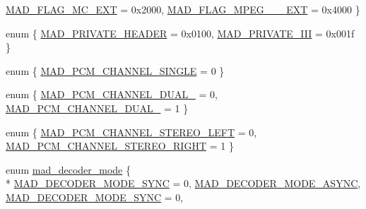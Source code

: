 \begin{DoxyCompactItemize}
\hyperlink{lib-src_2libmad_2msvc_09_09_2mad_8h_a5a77d65f4abba81d4456fa6ba8136e24a528d9a4b7522161be3007f1f75db51b0}{M\+A\+D\+\_\+\+F\+L\+A\+G\+\_\+\+M\+C\+\_\+\+E\+XT} = 0x2000, 
\hyperlink{lib-src_2libmad_2msvc_09_09_2mad_8h_a5a77d65f4abba81d4456fa6ba8136e24aa3a9b72a0bc8246559527bdd3e368caa}{M\+A\+D\+\_\+\+F\+L\+A\+G\+\_\+\+M\+P\+E\+G\+\_\+\_\+\_\+\+E\+XT} = 0x4000
 \}
\item 
enum \{ \hyperlink{lib-src_2libmad_2msvc_09_09_2mad_8h_aad393aa3e173d7f081ab4bbc6ba5027da0ff8b422c34ae6b5e18445b9a6d29cca}{M\+A\+D\+\_\+\+P\+R\+I\+V\+A\+T\+E\+\_\+\+H\+E\+A\+D\+ER} = 0x0100, 
\hyperlink{lib-src_2libmad_2msvc_09_09_2mad_8h_aad393aa3e173d7f081ab4bbc6ba5027daf758cc40b67b8026a690539980997422}{M\+A\+D\+\_\+\+P\+R\+I\+V\+A\+T\+E\+\_\+\+I\+II} = 0x001f
 \}
\item 
enum \{ \hyperlink{lib-src_2libmad_2msvc_09_09_2mad_8h_a4f126a0a9b1d8c6a8f46a051ef8830bbafae14beabc5daac23b169a27d1592161}{M\+A\+D\+\_\+\+P\+C\+M\+\_\+\+C\+H\+A\+N\+N\+E\+L\+\_\+\+S\+I\+N\+G\+LE} = 0
 \}
\item 
enum \{ \hyperlink{lib-src_2libmad_2msvc_09_09_2mad_8h_adbaf9202177df73e6880eab6e6aab329a96d03096fe786ca4ebd1c56783e215de}{M\+A\+D\+\_\+\+P\+C\+M\+\_\+\+C\+H\+A\+N\+N\+E\+L\+\_\+\+D\+U\+A\+L\+\_} = 0, 
\hyperlink{lib-src_2libmad_2msvc_09_09_2mad_8h_adbaf9202177df73e6880eab6e6aab329a0cb36fd87e1f82802bf7c770b5ed35f5}{M\+A\+D\+\_\+\+P\+C\+M\+\_\+\+C\+H\+A\+N\+N\+E\+L\+\_\+\+D\+U\+A\+L\+\_} = 1
 \}
\item 
enum \{ \hyperlink{lib-src_2libmad_2msvc_09_09_2mad_8h_a7495a48740c9d555f7fbcb48246dbd93a4eabf052fa0b2552b633c9a0cbed144b}{M\+A\+D\+\_\+\+P\+C\+M\+\_\+\+C\+H\+A\+N\+N\+E\+L\+\_\+\+S\+T\+E\+R\+E\+O\+\_\+\+L\+E\+FT} = 0, 
\hyperlink{lib-src_2libmad_2msvc_09_09_2mad_8h_a7495a48740c9d555f7fbcb48246dbd93a3947dd79b19e175a319de176c7c35f14}{M\+A\+D\+\_\+\+P\+C\+M\+\_\+\+C\+H\+A\+N\+N\+E\+L\+\_\+\+S\+T\+E\+R\+E\+O\+\_\+\+R\+I\+G\+HT} = 1
 \}
\item 
enum \hyperlink{lib-src_2libmad_2msvc_09_09_2mad_8h_a0d55d67e9f9acf69f677f86053e88b6a}{mad\+\_\+decoder\+\_\+mode} \{ \\*
\hyperlink{libmad_2decoder_8h_a0d55d67e9f9acf69f677f86053e88b6aa4670478d6f7c6dd89f794e9a87091ac2}{M\+A\+D\+\_\+\+D\+E\+C\+O\+D\+E\+R\+\_\+\+M\+O\+D\+E\+\_\+\+S\+Y\+NC} = 0, 
\hyperlink{libmad_2decoder_8h_a0d55d67e9f9acf69f677f86053e88b6aa0d44eb0cd37486eb0c2a67342423c8ca}{M\+A\+D\+\_\+\+D\+E\+C\+O\+D\+E\+R\+\_\+\+M\+O\+D\+E\+\_\+\+A\+S\+Y\+NC}, 
\hyperlink{lib-src_2libmad_2msvc_09_09_2mad_8h_a0d55d67e9f9acf69f677f86053e88b6aa4670478d6f7c6dd89f794e9a87091ac2}{M\+A\+D\+\_\+\+D\+E\+C\+O\+D\+E\+R\+\_\+\+M\+O\+D\+E\+\_\+\+S\+Y\+NC} = 0, 

\end{DoxyCompactItemize}
